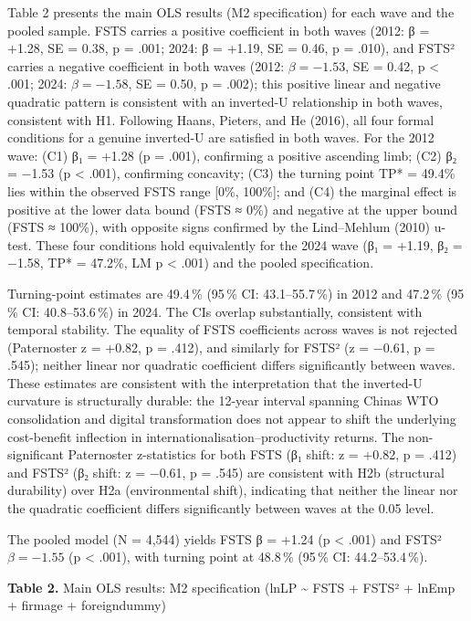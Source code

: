 \documentclass[12pt,a4paper]{article}
\begin{document}
Table 2 presents the main OLS results (M2 specification) for each wave
and the pooled sample. FSTS carries a positive coefficient in both waves
(2012: β = +1.28, SE = 0.38, p = .001; 2024: β = +1.19, SE = 0.46, p =
.010), and FSTS² carries a negative coefficient in both waves (2012:
\(\beta = −1.53\), SE = 0.42, p \textless{} .001; 2024:
\(\beta = −1.58\), SE = 0.50, p = .002); this positive linear and
negative quadratic pattern is consistent with an inverted-U relationship
in both waves, consistent with H1. Following Haans, Pieters, and He
(2016), all four formal conditions for a genuine inverted-U are
satisfied in both waves. For the 2012 wave: (C1) β₁ = +1.28 (p = .001),
confirming a positive ascending limb; (C2) β₂ = −1.53 (p \textless{}
.001), confirming concavity; (C3) the turning point TP* = 49.4\% lies
within the observed FSTS range {[}0\%, 100\%{]}; and (C4) the marginal
effect is positive at the lower data bound (FSTS ≈ 0\%) and negative at
the upper bound (FSTS ≈ 100\%), with opposite signs confirmed by the
Lind--Mehlum (2010) u-test. These four conditions hold equivalently for
the 2024 wave (β₁ = +1.19, β₂ = −1.58, TP* = 47.2\%, LM p \textless{}
.001) and the pooled specification.

Turning-point estimates are 49.4\,\% (95\,\% CI: 43.1--55.7\,\%) in 2012
and 47.2\,\% (95\,\% CI: 40.8--53.6\,\%) in 2024. The CIs overlap
substantially, consistent with temporal stability. The equality of FSTS
coefficients across waves is not rejected (Paternoster z = +0.82, p =
.412), and similarly for FSTS² (z = −0.61, p = .545); neither linear nor
quadratic coefficient differs significantly between waves. These
estimates are consistent with the interpretation that the inverted-U
curvature is structurally durable: the 12-year interval spanning
China\textquotesingle s WTO consolidation and digital transformation
does not appear to shift the underlying cost-benefit inflection in
internationalisation--productivity returns. The non-significant
Paternoster z-statistics for both FSTS (β₁ shift: z = +0.82, p = .412)
and FSTS² (β₂ shift: z = −0.61, p = .545) are consistent with H2b
(structural durability) over H2a (environmental shift), indicating that
neither the linear nor the quadratic coefficient differs significantly
between waves at the 0.05 level.

The pooled model (N = 4,544) yields FSTS β = +1.24 (p \textless{} .001)
and FSTS² \(\beta = −1.55\) (p \textless{} .001), with turning point at
48.8\,\% (95\,\% CI: 44.2--53.4\,\%).

\textbf{Table 2.} Main OLS results: M2 specification (lnLP
\textasciitilde{} FSTS + FSTS² + lnEmp + firmage + foreigndummy)
\end{document}
